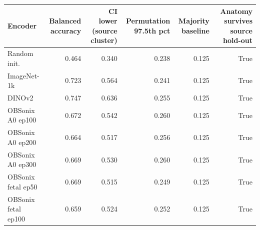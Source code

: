 \begin{tabular}{lrrrrr}
\toprule
Encoder & Balanced accuracy & CI lower (source cluster) & Permutation 97.5th pct & Majority baseline & Anatomy survives source hold-out \\
\midrule
Random init. & 0.464 & 0.340 & 0.238 & 0.125 & True \\
ImageNet-1k & 0.723 & 0.564 & 0.241 & 0.125 & True \\
DINOv2 & 0.747 & 0.636 & 0.255 & 0.125 & True \\
OBSonix A0 ep100 & 0.672 & 0.542 & 0.260 & 0.125 & True \\
OBSonix A0 ep200 & 0.664 & 0.517 & 0.256 & 0.125 & True \\
OBSonix A0 ep300 & 0.669 & 0.530 & 0.260 & 0.125 & True \\
OBSonix fetal ep50 & 0.669 & 0.515 & 0.249 & 0.125 & True \\
OBSonix fetal ep100 & 0.659 & 0.524 & 0.252 & 0.125 & True \\
\bottomrule
\end{tabular}
